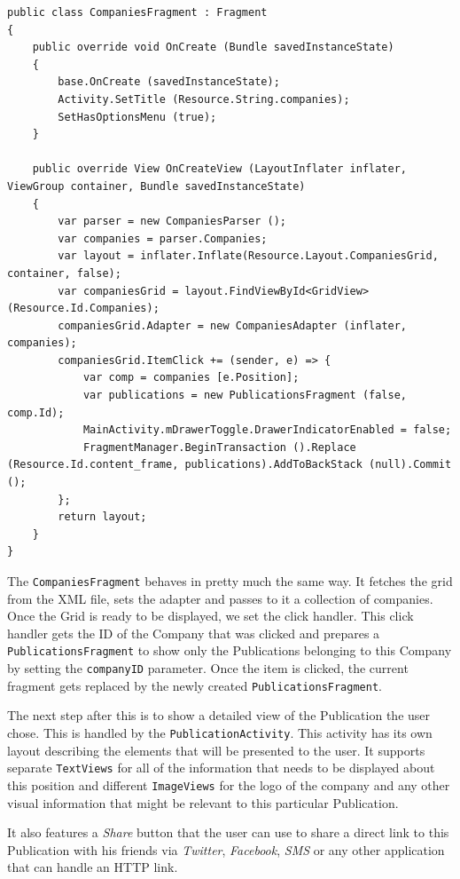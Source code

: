 \begin{lstlisting}[frame=lt,caption=CompaniesFragment.cs, label={list:comp_frag}]
public class CompaniesFragment : Fragment
{
	public override void OnCreate (Bundle savedInstanceState)
	{
		base.OnCreate (savedInstanceState);
		Activity.SetTitle (Resource.String.companies);
		SetHasOptionsMenu (true);
	}

	public override View OnCreateView (LayoutInflater inflater, ViewGroup container, Bundle savedInstanceState)
	{
		var parser = new CompaniesParser ();
		var companies = parser.Companies;
		var layout = inflater.Inflate(Resource.Layout.CompaniesGrid, container, false);
		var companiesGrid = layout.FindViewById<GridView> (Resource.Id.Companies);
		companiesGrid.Adapter = new CompaniesAdapter (inflater, companies);
		companiesGrid.ItemClick += (sender, e) => {
			var comp = companies [e.Position];
			var publications = new PublicationsFragment (false, comp.Id);
			MainActivity.mDrawerToggle.DrawerIndicatorEnabled = false;
			FragmentManager.BeginTransaction ().Replace (Resource.Id.content_frame, publications).AddToBackStack (null).Commit ();
		};
		return layout;
	}
}
\end{lstlisting}

The \texttt{CompaniesFragment} behaves in pretty much the same way. It fetches the grid from the \ac{XML} file, sets the adapter and passes to it a collection of companies. Once the Grid is ready to be displayed, we set the click handler. This click handler gets the ID of the Company that was clicked and prepares a \texttt{PublicationsFragment} to show only the Publications belonging to this Company by setting the \texttt{companyID} parameter. Once the item is clicked, the current fragment gets replaced by the newly created \texttt{PublicationsFragment}.

The next step after this is to show a detailed view of the Publication the user chose. This is handled by the \texttt{PublicationActivity}. This activity has its own layout describing the elements that will be presented to the user. It supports separate \texttt{TextViews} for all of the information that needs to be displayed about this position and different \texttt{ImageViews} for the logo of the company and any other visual information that might be relevant to this particular Publication.

It also features a \textit{Share} button that the user can use to share a direct link to this Publication with his friends via \textit{Twitter}, \textit{Facebook}, \textit{SMS} or any other application that can handle an HTTP link.






